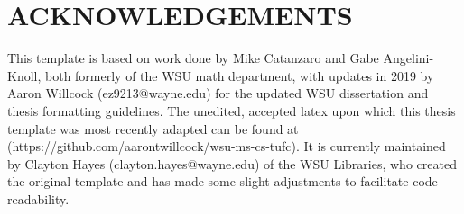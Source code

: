 \section*{ACKNOWLEDGEMENTS}
\begin{center}
	This template is based on work done by Mike Catanzaro and Gabe Angelini-Knoll, both formerly of the WSU math department, with updates in 2019 by Aaron Willcock (ez9213@wayne.edu) for the updated WSU dissertation and thesis formatting guidelines. The unedited, accepted latex upon which this thesis template was most recently adapted can be found at (https://github.com/aarontwillcock/wsu-ms-cs-tufc).
	It is currently maintained by Clayton Hayes (clayton.hayes@wayne.edu) of the WSU Libraries, who created the original template and has made some slight adjustments to facilitate code readability.
\end{center}
